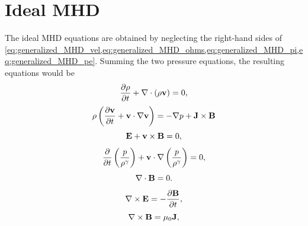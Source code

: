 \documentclass[a4paper,11pt]{report}
\begin{document}
\section{Ideal MHD}
The ideal MHD equations are obtained by neglecting the right-hand sides of \cref{eq:generalized_MHD_vel,eq:generalized_MHD_ohms,eq:generalized_MHD_pi,eq:generalized_MHD_pe}. Summing the two pressure equations, the resulting equations would be
\begin{equation}
    \frac{\partial \rho}{\partial t} + \nabla \cdot (\rho \mathbf{v}) = 0,
\end{equation}
\begin{equation}
    \rho \left (\frac{\partial \mathbf{v}}{\partial t} + \mathbf{v} \cdot \nabla \mathbf{v} \right ) = - \nabla p  + \mathbf{J} \times \mathbf{B}
\end{equation}
\begin{equation}
    \mathbf{E} + \mathbf{v} \times \mathbf{B} = 0,
\end{equation}
\begin{equation}
    \frac{\partial}{\partial t} \left ( \frac{p}{\rho^\gamma} \right ) + \mathbf{v} \cdot \nabla \left (\frac{p}{\rho^\gamma} \right ) = 0,
\end{equation}
\begin{equation}
\nabla \cdot \mathbf{B} = 0.
\end{equation}
\begin{equation}
\nabla \times \mathbf{E} = -\frac{ \partial \mathbf{B}}{\partial t},
\end{equation}
\begin{equation}
\nabla \times \mathbf{B} = \mu_0 \mathbf{J} ,
\end{equation}
\end{document}
